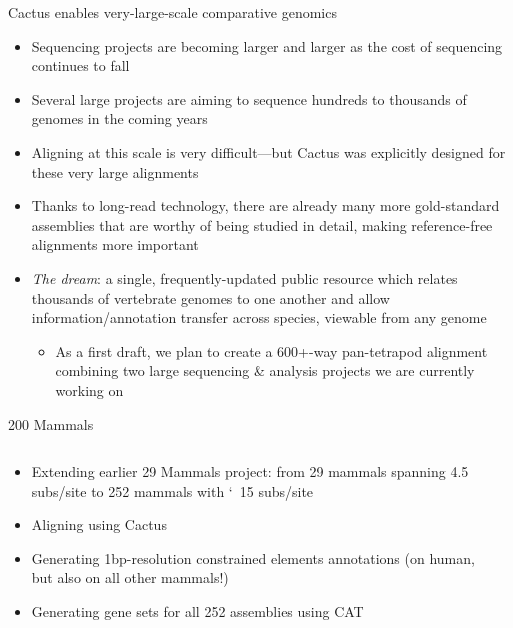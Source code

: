 \documentclass[10pt,
               hyperref={bookmarks=false,
                         bookmarksopen=false,
                         colorlinks=true,
                         linkcolor=blue,
                         urlcolor=blue},
               xcolor={svgnames,table}]{beamer}
\begin{document}
\begin{frame}{Cactus enables very-large-scale comparative genomics}
    \begin{itemize}
        \item Sequencing projects are becoming larger and larger as the cost of sequencing continues to fall
        \item Several large projects are aiming to sequence hundreds to thousands of genomes in the coming years
        \item Aligning at this scale is very difficult---but Cactus was explicitly designed for these very large alignments
        \item Thanks to long-read technology, there are already many more gold-standard assemblies that are worthy of being studied in detail, making reference-free alignments more important
        \item \emph{The dream}: a single, frequently-updated public resource which relates thousands of vertebrate genomes to one another and allow information/annotation transfer across species, viewable from any genome \begin{itemize}
            \item As a first draft, we plan to create a 600+-way pan-tetrapod alignment combining two large sequencing \& analysis projects we are currently working on
        \end{itemize}
    \end{itemize}
\end{frame}

\begin{frame}{200 Mammals}
  \begin{columns}
    \begin{column}{0.5\textwidth}
      \begin{itemize}
          \item Extending earlier 29 Mammals project: from 29 mammals spanning 4.5 subs/site to 252 mammals with \char`~15 subs/site
          \item Aligning using Cactus
          \item Generating 1bp-resolution constrained elements annotations (on human, but also on all other mammals!)
          \item Generating gene sets for all 252 assemblies using CAT
      \end{itemize}
    \end{column}
    \begin{column}{0.5\textwidth}
    \end{column}
  \end{columns}
\end{frame}
\end{document}
